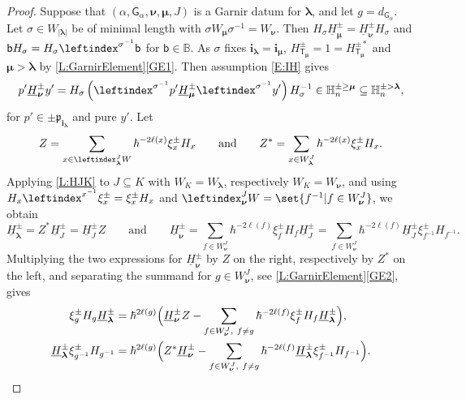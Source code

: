 \documentclass[a4paper,11pt]{amsart}
\newcommand\blam{{\boldsymbol\lambda}}
\newcommand\bmu{{\boldsymbol\mu}}
\newcommand\bnu{{\boldsymbol\nu}}
\newcommand\bi{\mathbf{i}}
\newcommand\ilam[1][\blam]{\bi_{#1}}
\numberwithin{equation}{subsection}
\theoremstyle{definition}
\theoremstyle{theorem}
\theoremstyle{remark}
\newcommand\plam[1][\lambda]{\mathfrak{p}_{#1}}
\newcommand\HH{\mathbb{H}}
\newcommand\HJpm{\underline{H}^\pm}
\newcommand\Sym{W}
\newcommand\xipm{\xi^\pm}
\newcommand\bb{\mathsf{b}}
\newcommand\bG{\mathsf{G}}
\newcommand\Tlam[1][\blam]{{\mathsf{T}_{#1}}}
\newcommand{\Bo}{\mathbb{B}}
\begin{document}
\begin{proof}   Suppose that $(\alpha,\bG_\alpha,\bnu,\bmu,J)$ is a Garnir datum for $\blam$, and let $g=d_{\bG_\alpha}$. Let $\sigma\in\Sym_{|\blam|}$ be of minimal length with $\sigma\Sym_\bmu\sigma^{-1}=\Sym_\bnu$. Then $H_\sigma\HJpm_\bmu=\HJpm_\bnu H_\sigma$ and $\bb H_\sigma=H_\sigma\leftindex^{\sigma^{-1}}\bb$ for $\bb\in\Bo$. As $\sigma$ fixes $\ilam=\bi_\bmu$, $H^\pm_{\Tlam[\bmu]}=1=H^{\pm*}_{\Tlam[\bmu]}$ and $\bmu>\blam$ by \autoref{L:GarnirElement}\autoref{GE1}. Then assumption \autoref{E:IH} gives
  \begin{equation}\label{E:Garnirmu}
    p'\HJpm_\bnu y'=H_\sigma\left(\leftindex^{\sigma^{-1}}{{p'}}\HJpm_\bmu\leftindex^{\sigma^{-1}}{{y'}}\right)H_\sigma^{-1}
    \in\HH^{\pm\ge\bmu}_n\subseteq\HH^{\pm>\blam}_n,
  \end{equation}
 for $p'\in\pm\plam[\ilam]$ and pure $y'$. Let
  \[
    Z=\sum_{x\in\leftindex^J_\blam\Sym}\hbar^{-2\ell(x)}\xipm_xH_x\qquad\text{and}\qquad
    Z^*=\sum_{x\in\Sym^J_\blam}\hbar^{-2\ell(x)}\xipm_xH_x.
  \]
  Applying \autoref{L:HJK} to $J\subseteq K$ with $\Sym_K=\Sym_\blam$, respectively $\Sym_K=\Sym_\bnu$, and using $H_x\leftindex^{x^{-1}}{{\xipm_x}}=\xipm_xH_x$ and $\leftindex^J_\bnu\Sym=\set{f^{-1}|f\in\Sym^J_\bnu}$, we obtain
  \[
    \HJpm_\blam=Z^*\HJpm_J=\HJpm_JZ\qquad\text{and}\qquad
    \HJpm_\bnu=\sum_{f\in\Sym^J_\bnu}\hbar^{-2\ell(f)}\xipm_fH_f\HJpm_J
      =\sum_{f\in\Sym^J_\bnu}\hbar^{-2\ell(f)}\HJpm_J\xipm_{f^{-1}}H_{f^{-1}}.
  \]
  Multiplying the two expressions for $\HJpm_\bnu$ by $Z$ on the right, respectively by $Z^*$ on the left, and separating the summand for $g\in\Sym^J_\bnu$, see \autoref{L:GarnirElement}\autoref{GE2}, gives
  \begin{align}
    \xipm_gH_g\HJpm_\blam&=\hbar^{2\ell(g)}\Bigl(\HJpm_\bnu Z
      -\sum_{f\in\Sym^J_\bnu,\ f\ne g}\hbar^{-2\ell(f)}\xipm_fH_f\HJpm_\blam\Bigr),\label{E:Garnirsum}\\
    \HJpm_\blam\xipm_{g^{-1}}H_{g^{-1}}&=\hbar^{2\ell(g)}\Bigl(Z^*\HJpm_\bnu
      -\sum_{f\in\Sym^J_\bnu,\ f\ne g}\hbar^{-2\ell(f)}\HJpm_\blam\xipm_{f^{-1}}H_{f^{-1}}\Bigr).
      \label{E:Garnirsumright}
  \end{align}


\end{proof}
\end{document}
